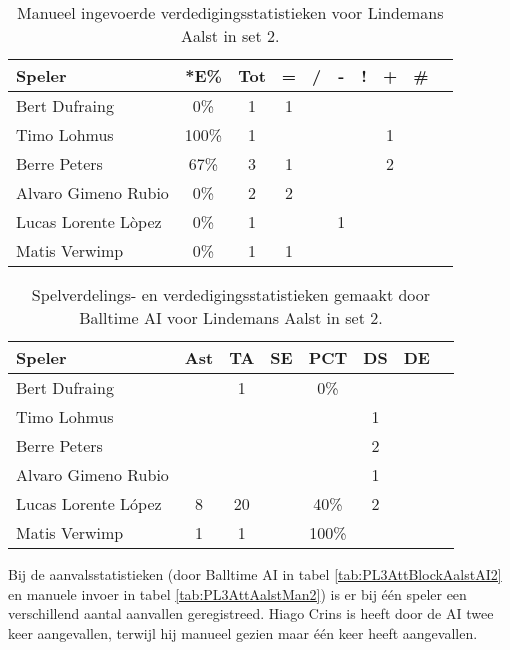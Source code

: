 \begin{table}[ht!]
    \centering
    \scriptsize
    \begin{tabular}{|l|c|c|c|c|c|c|c|c|c|}
        \hline
        \textbf{Speler} & *E\% & Tot & = & / & - & ! & + & \# \\ \hline
        Bert Dufraing & 0\% & 1 & 1 &  &  &  &  & \\ 
        Timo Lohmus & 100\% & 1 &  &  &  &  & 1 & \\ 
        Berre Peters & 67\% & 3 & 1 &  &  &  & 2 & \\ 
        Alvaro Gimeno Rubio & 0\% & 2 & 2 &  &  &  &  & \\ 
        Lucas Lorente Lòpez & 0\% & 1 &  &  & 1 &  &  & \\ 
        Matis Verwimp & 0\% & 1 & 1 & & & & & \\\hline
    \end{tabular}
    \caption[Manueel ingevoerde verdedigingsstatistieken voor Lindemans Aalst in set 2]{\label{tab:PL3DigAalstMan2}Manueel ingevoerde verdedigingsstatistieken voor Lindemans Aalst in set 2.}
\end{table}

\begin{table}[ht!]
  \centering
  \scriptsize
  \begin{tabular}{|l|c|c|c|c|c|c|c|} \hline
    \textbf{Speler} & Ast & TA & SE & PCT & DS & DE \\ \hline
    Bert Dufraing &  & 1 &  & 0\% &  &  \\
    Timo Lohmus &   &   &   &   & 1  &   \\
    Berre Peters &   &   &   &   &  2 &   \\
    Alvaro Gimeno Rubio &  &  &  &  & 1 &   \\
    Lucas Lorente López & 8 & 20 &  & 40\% & 2 &  \\
    Matis Verwimp & 1 & 1 &  & 100\% &   &   \\ \hline
  \end{tabular}
  \caption[Spelverdelings- en verdedigingsstatistieken gemaakt door Balltime AI voor Lindemans Aalst in set 2]{\label{tab:PL3SetDigAalstAI2}Spelverdelings- en verdedigingsstatistieken gemaakt door Balltime AI voor Lindemans Aalst in set 2.}
\end{table}

Bij de aanvalsstatistieken (door Balltime AI in tabel \ref{tab:PL3AttBlockAalstAI2} en manuele invoer in tabel \ref{tab:PL3AttAalstMan2}) is er bij één speler een verschillend aantal aanvallen geregistreed. Hiago Crins is heeft door de AI twee keer aangevallen, terwijl hij manueel gezien maar één keer heeft aangevallen.

